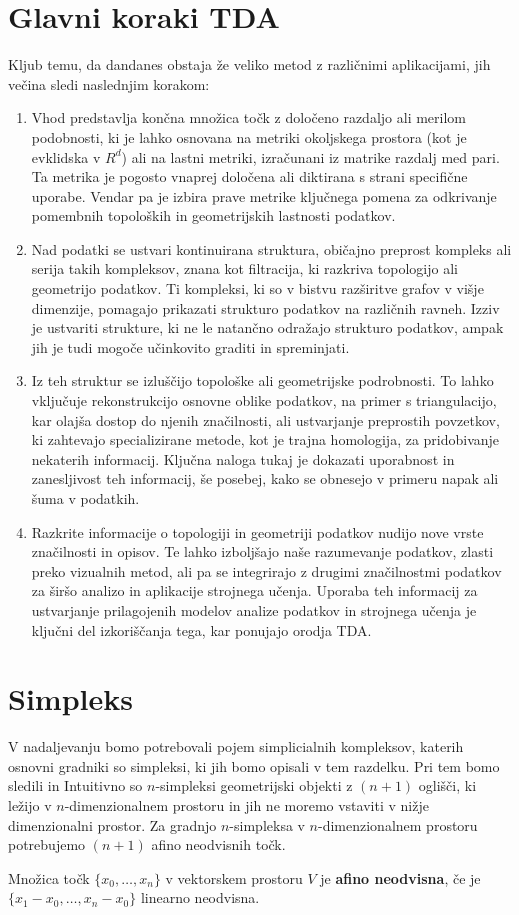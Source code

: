 \section{Glavni koraki TDA}
Kljub temu, da dandanes obstaja že veliko metod z različnimi aplikacijami, jih večina sledi naslednjim korakom:
\begin{enumerate}
    \item Vhod predstavlja končna množica točk z določeno razdaljo ali merilom podobnosti, ki je lahko osnovana na metriki okoljskega prostora (kot je evklidska v $R^d$) ali na lastni metriki, izračunani iz matrike razdalj med pari. Ta metrika je pogosto vnaprej določena ali diktirana s strani specifične uporabe. Vendar pa je izbira prave metrike ključnega pomena za odkrivanje pomembnih topoloških in geometrijskih lastnosti podatkov.
    \item Nad podatki se ustvari kontinuirana struktura, običajno preprost kompleks ali serija takih kompleksov, znana kot filtracija, ki razkriva topologijo ali geometrijo podatkov. Ti kompleksi, ki so v bistvu razširitve grafov v višje dimenzije, pomagajo prikazati strukturo podatkov na različnih ravneh. Izziv je ustvariti strukture, ki ne le natančno odražajo strukturo podatkov, ampak jih je tudi mogoče učinkovito graditi in spreminjati.
    \item Iz teh struktur se izluščijo topološke ali geometrijske podrobnosti. To lahko vključuje rekonstrukcijo osnovne oblike podatkov, na primer s triangulacijo, kar olajša dostop do njenih značilnosti, ali ustvarjanje preprostih povzetkov, ki zahtevajo specializirane metode, kot je trajna homologija, za pridobivanje nekaterih informacij. Ključna naloga tukaj je dokazati uporabnost in zanesljivost teh informacij, še posebej, kako se obnesejo v primeru napak ali šuma v podatkih.
    \item Razkrite informacije o topologiji in geometriji podatkov nudijo nove vrste značilnosti in opisov. Te lahko izboljšajo naše razumevanje podatkov, zlasti preko vizualnih metod, ali pa se integrirajo z drugimi značilnostmi podatkov za širšo analizo in aplikacije strojnega učenja. Uporaba teh informacij za ustvarjanje prilagojenih modelov analize podatkov in strojnega učenja je ključni del izkoriščanja tega, kar ponujajo orodja TDA.
\end{enumerate}

\section{Simpleks}
V nadaljevanju bomo potrebovali pojem simplicialnih kompleksov, katerih osnovni gradniki so simpleksi, ki jih bomo opisali v tem razdelku. Pri tem bomo sledili \cite{Urbančič_2020} in  Intuitivno so $n$-simpleksi geometrijski objekti z $(n + 1)$ oglišči, ki ležijo v $n$-dimenzionalnem prostoru in jih ne moremo vstaviti v nižje dimenzionalni prostor. Za gradnjo $n$-simpleksa v $n$-dimenzionalnem prostoru potrebujemo $(n + 1)$ afino neodvisnih točk.
\begin{definicija}
    Množica točk $\{x_0, \dots, x_n\}$ v vektorskem prostoru $V$ je \textbf{afino neodvisna}, če je $\{x_1 - x_0, \dots, x_n - x_0\}$ linearno neodvisna.
\end{definicija}


